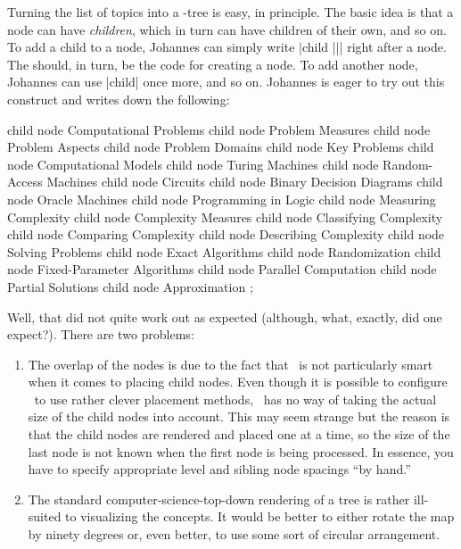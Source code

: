 Turning the list of topics into a \tikzname-tree is easy, in
principle. The basic idea is that a node can have \emph{children},
which in turn can have children of their own, and so on. To add a
child to a node, Johannes can simply write |child {||}|
right after a node. The  should, in turn, be the code for
creating a node. To add another node, Johannes can use |child| once
more, and so on. Johannes is eager to try out this construct and
writes down the following:

\begin{codeexample}[]
\tikz
    child { node {Computational Problems}
      child { node {Problem Measures} }
      child { node {Problem Aspects} }
      child { node {Problem Domains} }
      child { node {Key Problems} }
    }
    child { node {Computational Models}
      child { node {Turing Machines} }
      child { node {Random-Access Machines} }
      child { node {Circuits} }
      child { node {Binary Decision Diagrams} }
      child { node {Oracle Machines} }
      child { node {Programming in Logic} }
    }
    child { node {Measuring Complexity}
      child { node {Complexity Measures} }
      child { node {Classifying Complexity} }
      child { node {Comparing Complexity} }
      child { node {Describing Complexity} }
    }
    child { node {Solving Problems}
      child { node {Exact Algorithms} }
      child { node {Randomization} }
      child { node {Fixed-Parameter Algorithms} }
      child { node {Parallel Computation} }
      child { node {Partial Solutions} }
      child { node {Approximation} }
    };
\end{codeexample}

Well, that did not quite work out as expected (although, what,
exactly, did one expect?). There are two problems:
\begin{enumerate}
\item The overlap of the nodes is due to the fact that \tikzname\ is
  not particularly smart when it comes to placing child nodes. Even
  though it is possible to configure \tikzname\ to use rather clever
  placement methods, \tikzname\ has no way of taking the actual size
  of the child nodes into account. This may seem strange but the
  reason is that the child nodes are rendered and placed one at a
  time, so the size of the last node is not known when the first node
  is being processed. In essence, you have to specify appropriate
  level and sibling node spacings ``by hand.''
\item The standard computer-science-top-down rendering of a tree is
  rather ill-suited to visualizing the concepts. It would be better to
  either rotate the map by ninety degrees or, even better, to use some
  sort of circular arrangement.
\end{enumerate}

